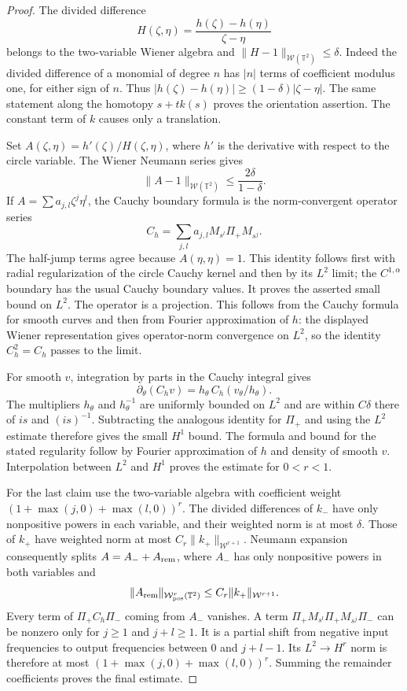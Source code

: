 \documentclass[11pt]{article}
\newcommand{\T}{\mathbb T}
\begin{document}
\begin{proof}
The divided difference
\[
 H(\zeta,\eta)=\frac{h(\zeta)-h(\eta)}{\zeta-\eta}
\]
belongs to the two-variable Wiener algebra and
$\|H-1\|_{\mathcal W(\T^2)}\le\delta$. Indeed the divided
difference of a monomial of degree $n$ has $|n|$ terms of
coefficient modulus one, for either sign of $n$. Thus
$|h(\zeta)-h(\eta)|\ge(1-\delta)|\zeta-\eta|$.
The same statement along the homotopy $s+tk(s)$ proves the
orientation assertion. The constant term of $k$ causes only a
translation.

Set $A(\zeta,\eta)=h'(\zeta)/H(\zeta,\eta)$, where $h'$ is the
derivative with respect to the circle variable. The Wiener
Neumann series gives
\[
 \|A-1\|_{\mathcal W(\T^2)}
       \le\frac{2\delta}{1-\delta}.
\]
If $A=\sum a_{j,l}\zeta^j\eta^l$, the Cauchy boundary formula is
the norm-convergent operator series
\[
 C_h=\sum_{j,l}a_{j,l}M_{s^l}\Pi_+M_{s^j}.
\]
The half-jump terms agree because $A(\eta,\eta)=1$.
This identity follows first with radial regularization of the
circle Cauchy kernel and then by its $L^2$ limit; the
$C^{1,\alpha}$ boundary has the usual Cauchy boundary values.
It proves the asserted small bound on $L^2$.
The operator is a projection. This follows from the Cauchy formula
for smooth curves and then from Fourier approximation of $h$:
the displayed Wiener representation gives operator-norm convergence
on $L^2$, so the identity $C_h^2=C_h$ passes to the limit.

For smooth $v$, integration by parts in the Cauchy integral gives
\[
 \partial_\theta(C_hv)
  =h_\theta\,C_h(v_\theta/h_\theta).
\]
The multipliers $h_\theta$ and $h_\theta^{-1}$ are uniformly
bounded on $L^2$ and are within $C\delta$ there of $is$ and
$(is)^{-1}$. Subtracting the analogous identity for $\Pi_+$ and
using the $L^2$ estimate therefore gives the small $H^1$ bound.
The formula and bound for the stated regularity follow by Fourier
approximation of $h$ and density of smooth $v$. Interpolation
between $L^2$ and $H^1$ proves the estimate for $0<r<1$.

For the last claim use the two-variable algebra with coefficient
weight $(1+\max(j,0)+\max(l,0))^r$. The divided differences of
$k_-$ have only nonpositive powers in each variable, and their
weighted norm is at most $\delta$. Those of $k_+$ have weighted
norm at most $C_r\|k_+\|_{\mathcal W^{r+1}}$.
Neumann expansion consequently splits $A=A_-+A_{\rm rem}$, where
$A_-$ has only nonpositive powers in both variables and
\[
 \|A_{\rm rem}\|_{\mathcal W_{\rm pos}^r(\T^2)}
      \le C_r\|k_+\|_{\mathcal W^{r+1}}.
\]
Every term of $\Pi_+C_h\Pi_-$ coming from $A_-$ vanishes. A term
$\Pi_+M_{s^l}\Pi_+M_{s^j}\Pi_-$ can be nonzero only for $j\ge1$
and $j+l\ge1$. It is a partial shift from negative input
frequencies to output frequencies between $0$ and $j+l-1$.
Its $L^2\to H^r$ norm is therefore at most
$(1+\max(j,0)+\max(l,0))^r$. Summing the remainder coefficients
proves the final estimate.
\end{proof}
\end{document}
